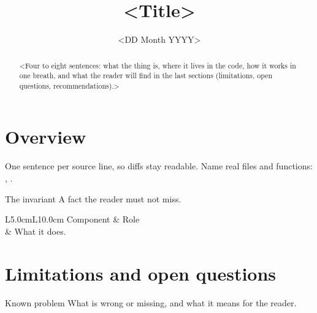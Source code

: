 \documentclass[11pt,a4paper]{article}
\title{\textbf{<Title>}\\[0.3em]
\large <Subtitle: the question this document answers>}
\date{<DD Month YYYY>}
\begin{document}
\maketitle

\begin{abstract}
\noindent
<Four to eight sentences: what the thing is, where it lives in the code,
how it works in one breath, and what the reader will find in the last
sections (limitations, open questions, recommendations).>
\end{abstract}

\setcounter{tocdepth}{2}
\tableofcontents
\clearpage

\section{Overview}

One sentence per source line, so diffs stay readable.
Name real files and functions: , .

\begin{keybox}{The invariant}
A fact the reader must not miss.
\end{keybox}

\begin{center}
\small
\begin{tabular}{L{5.0cm}L{10.0cm}}
\toprule
Component & Role \\
\midrule
{} & What it does. \\
\bottomrule
\end{tabular}
\end{center}

\section{Limitations and open questions}\label{sec:limits}

\begin{warnbox}{Known problem}
What is wrong or missing, and what it means for the reader.
\end{warnbox}
\end{document}

